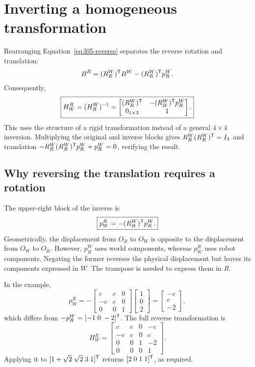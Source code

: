\section{Inverting a homogeneous transformation}
Rearranging Equation~\eqref{eq:l05-reverse} separates the reverse rotation
and translation:
\[
 B^R=(R_R^W)^{\mathsf T} B^W-(R_R^W)^{\mathsf T} p_R^W.
\]
Consequently,
\begin{equation}
 \boxed{H_W^R=(H_R^W)^{-1}
 =\begin{bmatrix}(R_R^W)^{\mathsf T}&-(R_R^W)^{\mathsf T} p_R^W\\0_{1\times3}&1\end{bmatrix}.}
 \label{eq:l05-inverse}
\end{equation}
This uses the structure of a rigid transformation instead of a general
$4\times4$ inversion. Multiplying the original and inverse blocks gives
$R_R^W(R_R^W)^{\mathsf T}=I_3$ and translation
$-R_R^W(R_R^W)^{\mathsf T} p_R^W+p_R^W=0$, verifying the result.

\subsection{Why reversing the translation requires a rotation}
The upper-right block of the inverse is
\begin{equation}
 \boxed{p_W^R=-(R_R^W)^{\mathsf T} p_R^W.}
 \label{eq:l05-inverse-position}
\end{equation}
Geometrically, the displacement from $O_R$ to $O_W$ is opposite to the
displacement from $O_W$ to $O_R$. However, $p_R^W$ uses world components,
whereas $p_W^R$ uses robot components. Negating the former reverses the
physical displacement but leaves its components expressed in $W$.
The transpose is needed to express them in $R$.

In the example,
\[
 p_W^R=-\begin{bmatrix}c&c&0\\-c&c&0\\0&0&1\end{bmatrix}
 \begin{bmatrix}1\\0\\2\end{bmatrix}
 =\begin{bmatrix}-c\\c\\-2\end{bmatrix},
\]
which differs from $-p_R^W=[-1\;0\;-2]^{\mathsf T}$. The full reverse transformation is
\[
 H_W^R=\begin{bmatrix}c&c&0&-c\\-c&c&0&c\\0&0&1&-2\\0&0&0&1\end{bmatrix}.
\]
Applying it to $[1+\sqrt2\;\sqrt2\;3\;1]^{\mathsf T}$ returns
$[2\;0\;1\;1]^{\mathsf T}$, as required.

